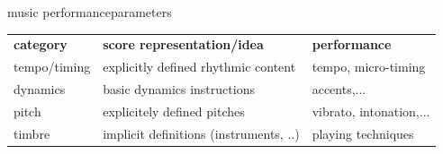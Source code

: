         \begin{frame}{music performance}{parameters}
            \begin{table}
            \begin{tabular}{lll}
                \textbf{category}   & \textbf{score representation/idea} & \textbf{performance} \\
                [3mm]
                tempo/timing        & explicitly defined rhythmic content&  tempo, micro-timing\\
                [1mm]
                dynamics            &basic dynamics instructions            & accents,...\\
                [1mm]
                pitch               & explicitely defined pitches           & vibrato, intonation,...\\
                [1mm]
                timbre              & implicit definitions (instruments, ..) & playing techniques
            \end{tabular}
            \end{table}
            
        \end{frame}
   
